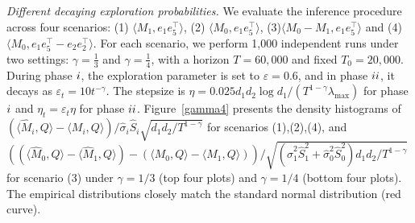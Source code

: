 \documentclass[12pt]{article}
\newcommand{\inp}[2]{\langle #1,#2\rangle}
\theoremstyle{plain}
\begin{document}
\emph{Different decaying exploration probabilities.} We evaluate the inference procedure across four scenarios: (1) $\inp{M_1}{e_1e_5^{\top}}$, (2) $\inp{M_0}{e_1e_5^{\top}}$, (3)$\inp{M_0-M_1}{e_1e_5^{\top}}$  and (4) $\inp{M_0}{e_1e_5^{\top} - e_2e_2^{\top}}$. For each scenario, we perform 1,000 independent runs under two settings: $\gamma=\frac{1}{3}$ and $\gamma=\frac{1}{4}$, with a horizon $T=60,000$ and fixed $T_0=20,000$. During phase $\uppercase\expandafter{\romannumeral1}$, the exploration parameter is set to $\varepsilon=0.6$, and in phase $\uppercase\expandafter{\romannumeral2}$, it decays as $\varepsilon_t=10t^{-\gamma}$. The stepsize is $\eta=0.025d_1d_2\log d_1/(T^{1-\gamma}\lambda_{\max})$ for phase $\uppercase\expandafter{\romannumeral1}$ and $\eta_t=\varepsilon_t\eta$ for phase $\uppercase\expandafter{\romannumeral2}$.
Figure~\ref{gamma4} presents the density histograms of $(\inp{\widehat{M}_i}{Q} - \inp{M_i}{Q})/\widehat{\sigma}_i\widehat{S}_i\sqrt{d_1d_2/T^{1-\gamma}}$ for scenarios (1),(2),(4), and $((\inp{\widehat{M}_0}{Q} - \inp{\widehat{M}_1}{Q}) - (\inp{M_0}{Q} - \inp{M_1}{Q}))/\sqrt{(\widehat{\sigma}_1^2\widehat{S}_1^2+\widehat{\sigma}_0^2\widehat{S}_0^2)d_1d_2/T^{1-\gamma}}$ for scenario (3) under $\gamma=1/3$ (top four plots) and $\gamma=1/4$ (bottom four plots). The empirical distributions closely match the standard normal distribution (red curve).
\end{document}
